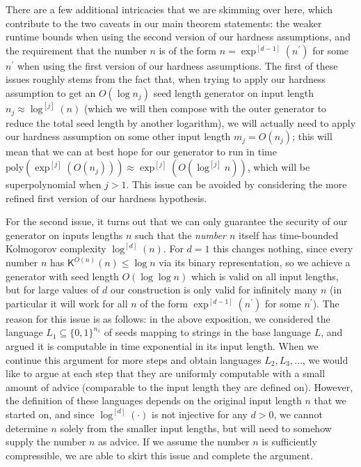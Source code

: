 There are a few additional intricacies that we are skimming over here, which contribute to the two caveats in our main theorem statements: the weaker runtime bounds when using the second version of our hardness assumptions, and the requirement that the number $n$ is of the form $n=\exp^{[d-1]}(n^{\prime})$ for some $n^{\prime}$ when using the first version of our hardness assumptions. The first of these issues roughly stems from the fact that, when trying to apply our hardness assumption to get an $O(\log n_{j})$ seed length generator on input length $n_{j}\approx\log^{[j]}(n)$ (which we will then compose with the outer generator to reduce the total seed length by another logarithm), we will actually need to apply our hardness assumption on some other input length $m_{j}=O(n_{j})$; this will mean that we can at best hope for our generator to run in time $\mathrm{poly}(\exp^{[j]}(O(n_{j})))\approx\exp^{[j]}(O(\log^{[j]}n))$, which will be superpolynomial when $j>1$. This issue can be avoided by considering the more refined first version of our hardness hypothesis.\par




For the second issue, it turns out that we can only guarantee the security of our generator on inputs lengths $n$ such that the \emph{number $n$} itself has time-bounded Kolmogorov complexity $\log^{[d]}(n)$. For $d=1$ this changes nothing, since every number $n$ has ${\mathsf{K}}^{O(n)}(n)\leq\log n$ via its binary representation, so we achieve a generator with seed length $O(\log\log n)$ which is valid on all input lengths, but for large values of $d$ our construction is only valid for infinitely many $n$ (in particular it will work for all $n$ of the form $\exp^{[d-1]}(n^{\prime})$ for some $n^{\prime}$). The reason for this issue is as follows: in the above exposition, we considered the language $L_{1}\subseteq\{0,1\}^{n_{1}}$ of seeds mapping to strings in the base language $L$, and argued it is computable in time exponential in its input length. When we continue this argument for more steps and obtain languages $L_{2},L_{3},\ldots$, we would like to argue at each step that they are uniformly computable with a small amount of advice (comparable to the input length they are defined on). However, the definition of these languages depends on the original input length $n$ that we started on, and since $\log^{[d]}(\cdot)$ is not injective for any $d>0$, we cannot determine $n$ solely from the smaller input lengths, but will need to somehow supply the number $n$ as advice. If we assume the number $n$ is sufficiently compressible, we are able to skirt this issue and complete the argument.\par





